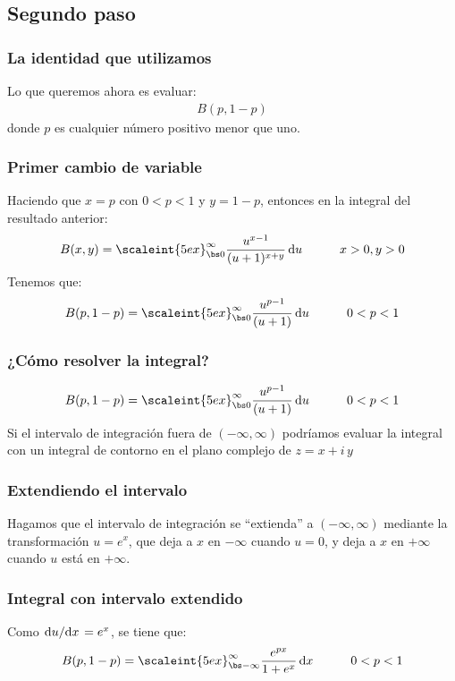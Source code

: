 \documentclass[12pt]{beamer}
\begin{document}
\subsection{Segundo paso}

\begin{frame}
\frametitle{La identidad que utilizamos}
Lo que queremos ahora es evaluar:
\pause
\begin{align*}
B(p, 1 - p)
\end{align*}
donde $p$ es cualquier número positivo menor que uno.
\end{frame}
\begin{frame}
\frametitle{Primer cambio de variable}
Haciendo que \pause $x = p$ con $0 < p < 1$ \pause y $y = 1 - p$, entonces en la integral del resultado anterior:
\pause
\begin{align*}
B(x, y) = \scaleint{5ex}_{\bs 0}^{\infty} \dfrac{u^{x-1}}{(u + 1)^{x+y}} \dd{u} \hspace{1cm} x > 0, y > 0
\end{align*}
\pause
Tenemos que:
\begin{align*}
B(p, 1 - p) = \scaleint{5ex}_{\bs 0}^{\infty} \dfrac{u^{p-1}}{(u + 1)} \dd{u} \hspace{1cm} 0 < p < 1
\end{align*}
\end{frame}
\begin{frame}
\frametitle{¿Cómo resolver la integral?}
\begin{align*}
B(p, 1 - p) = \scaleint{5ex}_{\bs 0}^{\infty} \dfrac{u^{p-1}}{(u + 1)} \dd{u} \hspace{1cm} 0 < p < 1
\end{align*}
\pause
Si el intervalo de integración fuera de $(-\infty, \infty)$ podríamos evaluar la integral con un integral de contorno en el plano complejo de $z = x +  i \, y$ 
\end{frame}
\begin{frame}
\frametitle{Extendiendo el intervalo}
Hagamos que el intervalo de integración se \enquote{extienda} a $(-\infty, \infty)$ \pause mediante la transformación $u = e^{x}$, que deja a $x$ en $-\infty$ cuando $u = 0$, y deja a $x$ en $+\infty$ cuando $u$ está en $+\infty$.
\end{frame}
\begin{frame}
\frametitle{Integral con intervalo extendido}
Como $\dv*{u}{x} = e^{x}$, se tiene que:
\pause
\begin{align*}
B(p, 1 - p) = \scaleint{5ex}_{\bs -\infty}^{\infty} \dfrac{e^{px}}{1 + e^{x}} \dd{x} \hspace{1cm} 0 < p < 1
\end{align*}
\end{frame}
\end{document}
